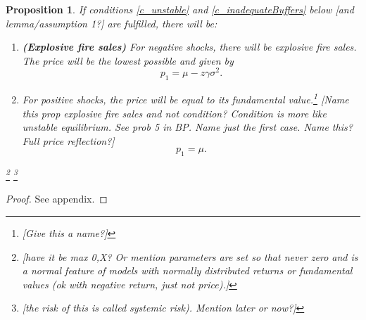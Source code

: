 \documentclass[11pt]{article}
\newtheorem{proposition}{Proposition}
\begin{document}
\begin{proposition} \label{p_explosiveFiresales}
If conditions \ref{c_unstable} and \ref{c_inadequateBuffers} below [and lemma/assumption 1?] are fulfilled, there will be:

\begin{enumerate}[label = \roman*)]
\item[\textnormal{i)}] \textnormal{\textbf{(Explosive fire sales)}} For negative shocks, there will be explosive fire sales. The price will be the lowest possible and given by
\begin{equation}
p_1 = \mu - z\gamma\sigma^2.
\end{equation}
\item[\textnormal{ii)}]  For positive shocks, the price will be equal to its fundamental value.\footnote{[Give this a name?]}
[Name this prop explosive fire sales and not condition? Condition is more like unstable equilibrium. See prob 5 in BP. Name just the first case. Name this? Full price reflection?]
\begin{equation}
p_1 =  \mu.
\end{equation}
\end{enumerate}


\footnote{[have it be max 0,X? Or mention parameters are set so that never zero and is a normal feature of models with normally distributed returns or fundamental values (ok with negative return, just not price).]}
\footnote{[the risk of this is called systemic risk). Mention later or now?]}
\end{proposition}
\begin{proof}
See appendix.
\end{proof}
\end{document}
